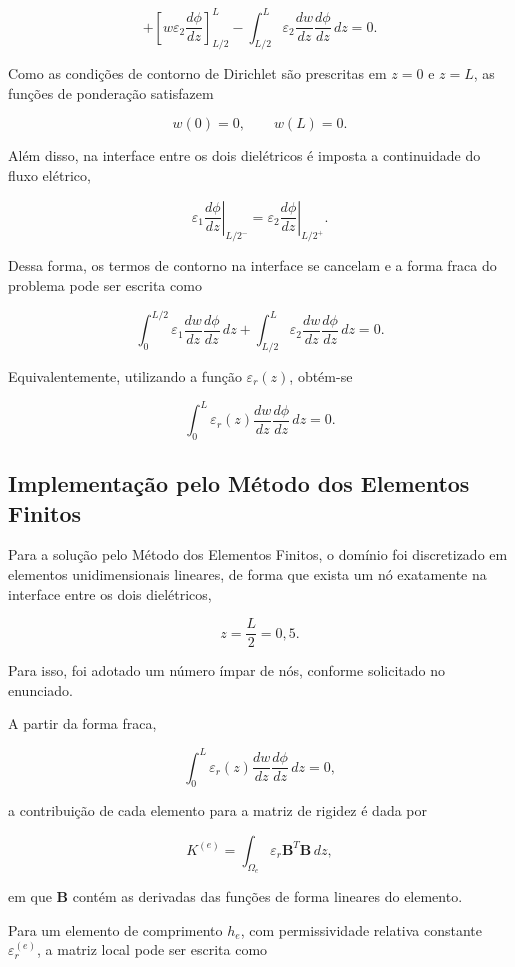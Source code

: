 \[
+
\left[
w\varepsilon_2\frac{d\phi}{dz}
\right]_{L/2}^{L}
-
\int_{L/2}^{L}
\varepsilon_2
\frac{dw}{dz}
\frac{d\phi}{dz}
\,dz
=0.
\]

Como as condições de contorno de Dirichlet são prescritas em \(z=0\) e \(z=L\), as funções de ponderação satisfazem

\[
w(0)=0,
\qquad
w(L)=0.
\]

Além disso, na interface entre os dois dielétricos é imposta a continuidade do fluxo elétrico,

\[
\varepsilon_1
\left.
\frac{d\phi}{dz}
\right|_{L/2^-}
=
\varepsilon_2
\left.
\frac{d\phi}{dz}
\right|_{L/2^+}.
\]

Dessa forma, os termos de contorno na interface se cancelam e a forma fraca do problema pode ser escrita como

\[
\int_{0}^{L/2}
\varepsilon_1
\frac{dw}{dz}
\frac{d\phi}{dz}
\,dz
+
\int_{L/2}^{L}
\varepsilon_2
\frac{dw}{dz}
\frac{d\phi}{dz}
\,dz
=0.
\]

Equivalentemente, utilizando a função \(\varepsilon_r(z)\), obtém-se

\[
\int_{0}^{L}
\varepsilon_r(z)
\frac{dw}{dz}
\frac{d\phi}{dz}
\,dz
=0.
\]

\subsection{Implementação pelo Método dos Elementos Finitos}

Para a solução pelo Método dos Elementos Finitos, o domínio foi discretizado em elementos unidimensionais lineares, de forma que exista um nó exatamente na interface entre os dois dielétricos,

\[
z=\frac{L}{2}=0{,}5.
\]

Para isso, foi adotado um número ímpar de nós, conforme solicitado no enunciado.

A partir da forma fraca,

\[
\int_{0}^{L}
\varepsilon_r(z)
\frac{dw}{dz}
\frac{d\phi}{dz}
\,dz
=0,
\]

a contribuição de cada elemento para a matriz de rigidez é dada por

\[
K^{(e)}
=
\int_{\Omega_e}
\varepsilon_r
\mathbf{B}^{T}\mathbf{B}
\,dz,
\]

em que \(\mathbf{B}\) contém as derivadas das funções de forma lineares do elemento.

Para um elemento de comprimento \(h_e\), com permissividade relativa constante \(\varepsilon_r^{(e)}\), a matriz local pode ser escrita como

